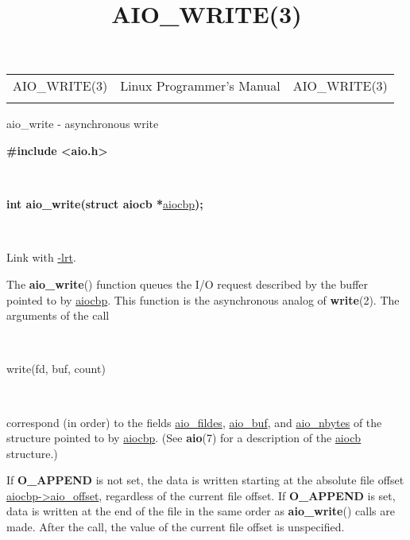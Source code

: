 \documentclass[]{article}
\title{AIO\_WRITE(3)}
\author{}
\date{}
\let\realtextbf=\textbf
\renewcommand{\textbf}[1]{\textcolor{boldcolor}{\realtextbf{#1}}}
\renewcommand{\emph}[1]{\underline{#1}}
\begin{document}
\maketitle

\begin{longtable}[c]{@{}lll@{}}
\toprule\addlinespace
AIO\_WRITE(3) & Linux Programmer's Manual & AIO\_WRITE(3)
\\\addlinespace
\bottomrule
\end{longtable}


aio\_write - asynchronous write


\textbf{\#include \textless{}aio.h\textgreater{}}

~

\textbf{int aio\_write(struct aiocb *}\emph{aiocbp}\textbf{);}

~

Link with \emph{-lrt}.


The \textbf{aio\_write}() function queues the I/O request described by
the buffer pointed to by \emph{aiocbp}. This function is the
asynchronous analog of \textbf{write}(2). The arguments of the call

~

write(fd, buf, count)

~

correspond (in order) to the fields \emph{aio\_fildes}, \emph{aio\_buf},
and \emph{aio\_nbytes} of the structure pointed to by \emph{aiocbp}.
(See \textbf{aio}(7) for a description of the \emph{aiocb} structure.)

If \textbf{O\_APPEND} is not set, the data is written starting at the
absolute file offset \emph{aiocbp-\textgreater{}aio\_offset}, regardless
of the current file offset. If \textbf{O\_APPEND} is set, data is
written at the end of the file in the same order as
\textbf{aio\_write}() calls are made. After the call, the value of the
current file offset is unspecified.
\end{document}
